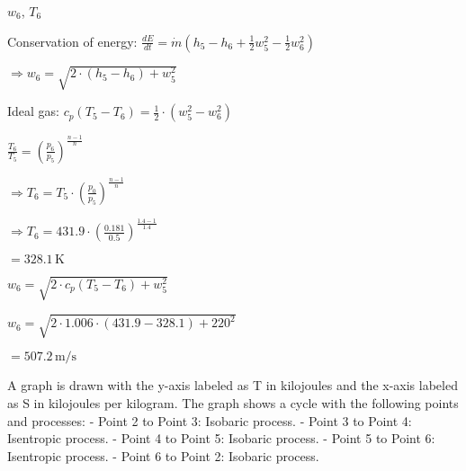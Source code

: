 \( w_6 \), \( T_6 \)  

Conservation of energy:  
\( \frac{dE}{dt} = \dot{m} \left( h_5 - h_6 + \frac{1}{2} w_5^2 - \frac{1}{2} w_6^2 \right) \)  

\( \Rightarrow w_6 = \sqrt{2 \cdot \left( h_5 - h_6 \right) + w_5^2} \)  

Ideal gas:  
\( c_p \left( T_5 - T_6 \right) = \frac{1}{2} \cdot \left( w_5^2 - w_6^2 \right) \)  

\( \frac{T_6}{T_5} = \left( \frac{p_6}{p_5} \right)^{\frac{n-1}{n}} \)  

\( \Rightarrow T_6 = T_5 \cdot \left( \frac{p_0}{p_5} \right)^{\frac{n-1}{n}} \)  

\( \Rightarrow T_6 = 431.9 \cdot \left( \frac{0.181}{0.5} \right)^{\frac{1.4-1}{1.4}} \)  

\( = 328.1 \, \text{K} \)  

\( w_6 = \sqrt{2 \cdot c_p \left( T_5 - T_6 \right) + w_5^2} \)  

\( w_6 = \sqrt{2 \cdot 1.006 \cdot \left( 431.9 - 328.1 \right) + 220^2} \)  

\( = 507.2 \, \text{m/s} \)

A graph is drawn with the y-axis labeled as T in kilojoules and the x-axis labeled as S in kilojoules per kilogram.  
The graph shows a cycle with the following points and processes:  
- Point 2 to Point 3: Isobaric process.  
- Point 3 to Point 4: Isentropic process.  
- Point 4 to Point 5: Isobaric process.  
- Point 5 to Point 6: Isentropic process.  
- Point 6 to Point 2: Isobaric process.